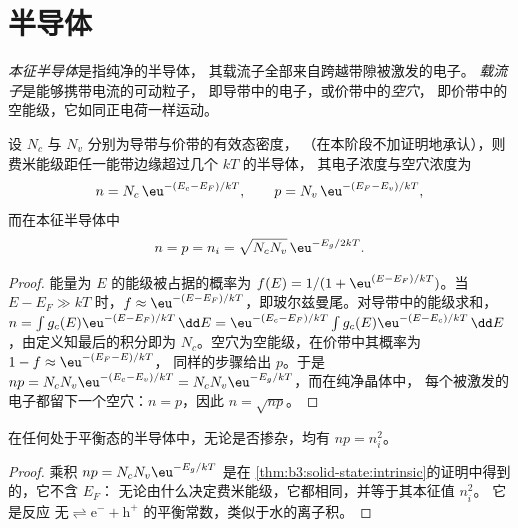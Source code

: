 \section{半导体}

\begin{definition}[载流子]\label{def:b3:solid-state:carriers}
\emph{本征半导体}是指纯净的半导体，
其载流子全部来自跨越带隙被激发的电子。
\emph{载流子}是能够携带电流的可动粒子，
即导带中的电子，或价带中的\emph{空穴}，
即价带中的空能级，它如同正电荷一样运动。
\end{definition}

\begin{theorem}[本征载流子浓度]\label{thm:b3:solid-state:intrinsic}
设 $N_c$ 与 $N_v$ 分别为导带与价带的有效态密度，
（在本阶段不加证明地承认），则费米能级距任一能带边缘超过几个 $kT$ 的半导体，
其电子浓度与空穴浓度为
\[
  n = N_c\,\eu^{-(E_c - E_F)/kT}, \qquad p = N_v\,\eu^{-(E_F - E_v)/kT},
\]
而在本征半导体中
\[
  n = p = n_i = \sqrt{N_cN_v}\,\eu^{-E_g/2kT}.
\]
\end{theorem}

\begin{proof}
能量为 $E$ 的能级被占据的概率为 $f(E) = 1/(1 + \eu^{(E - E_F)/kT})$。当
$E - E_F \gg kT$ 时，$f \approx \eu^{-(E - E_F)/kT}$，即玻尔兹曼尾。对导带中的能级求和，
$n = \int g_c(E)\eu^{-(E - E_F)/kT}\,\dd E = \eu^{-(E_c - E_F)/kT}\int g_c(E)\eu^{-(E - E_c)/kT}\,\dd E$，由定义知最后的积分即为
$N_c$。空穴为空能级，在价带中其概率为 $1 - f \approx \eu^{-(E_F - E)/kT}$，
同样的步骤给出 $p$。于是 $np = N_cN_v\eu^{-(E_c - E_v)/kT} = N_cN_v\eu^{-E_g/kT}$，而在纯净晶体中，
每个被激发的电子都留下一个空穴：$n = p$，因此 $n = \sqrt{np}$。
\end{proof}

\begin{proposition}[质量作用定律]\label{prop:b3:solid-state:mass-action}
在任何处于平衡态的半导体中，无论是否掺杂，均有 $np = n_i^2$。
\end{proposition}

\begin{proof}
乘积 $np = N_cN_v\eu^{-E_g/kT}$ 是在
\cref{thm:b3:solid-state:intrinsic}的证明中得到的，它不含 $E_F$：
无论由什么决定费米能级，它都相同，并等于其本征值 $n_i^2$。
它是反应 $\text{无} \rightleftharpoons \mathrm e^- + \mathrm h^+$ 的平衡常数，类似于水的离子积。
\end{proof}

